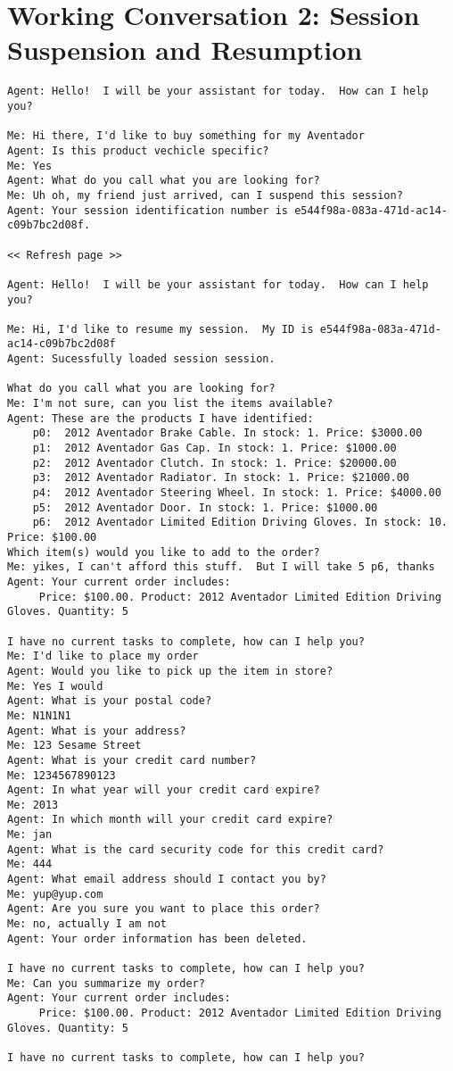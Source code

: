 \documentclass[11pt, titlepage]{article}
\begin{document}
\section{Working Conversation 2: Session Suspension and Resumption}
\begin{lstlisting}
Agent: Hello!  I will be your assistant for today.  How can I help you?

Me: Hi there, I'd like to buy something for my Aventador
Agent: Is this product vechicle specific?
Me: Yes
Agent: What do you call what you are looking for?
Me: Uh oh, my friend just arrived, can I suspend this session?
Agent: Your session identification number is e544f98a-083a-471d-ac14-c09b7bc2d08f.

<< Refresh page >>

Agent: Hello!  I will be your assistant for today.  How can I help you?

Me: Hi, I'd like to resume my session.  My ID is e544f98a-083a-471d-ac14-c09b7bc2d08f
Agent: Sucessfully loaded session session.

What do you call what you are looking for?
Me: I'm not sure, can you list the items available?
Agent: These are the products I have identified:
	p0:	 2012 Aventador Brake Cable. In stock: 1. Price: $3000.00
	p1:	 2012 Aventador Gas Cap. In stock: 1. Price: $1000.00
	p2:	 2012 Aventador Clutch. In stock: 1. Price: $20000.00
	p3:	 2012 Aventador Radiator. In stock: 1. Price: $21000.00
	p4:	 2012 Aventador Steering Wheel. In stock: 1. Price: $4000.00
	p5:	 2012 Aventador Door. In stock: 1. Price: $1000.00
	p6:	 2012 Aventador Limited Edition Driving Gloves. In stock: 10. Price: $100.00
Which item(s) would you like to add to the order?
Me: yikes, I can't afford this stuff.  But I will take 5 p6, thanks
Agent: Your current order includes:
	 Price: $100.00. Product: 2012 Aventador Limited Edition Driving Gloves. Quantity: 5

I have no current tasks to complete, how can I help you?
Me: I'd like to place my order
Agent: Would you like to pick up the item in store?
Me: Yes I would
Agent: What is your postal code?
Me: N1N1N1
Agent: What is your address?
Me: 123 Sesame Street
Agent: What is your credit card number?
Me: 1234567890123
Agent: In what year will your credit card expire?
Me: 2013
Agent: In which month will your credit card expire?
Me: jan
Agent: What is the card security code for this credit card?
Me: 444
Agent: What email address should I contact you by?
Me: yup@yup.com
Agent: Are you sure you want to place this order?
Me: no, actually I am not
Agent: Your order information has been deleted.

I have no current tasks to complete, how can I help you?
Me: Can you summarize my order?
Agent: Your current order includes:
	 Price: $100.00. Product: 2012 Aventador Limited Edition Driving Gloves. Quantity: 5

I have no current tasks to complete, how can I help you?
\end{lstlisting}
\end{document}
